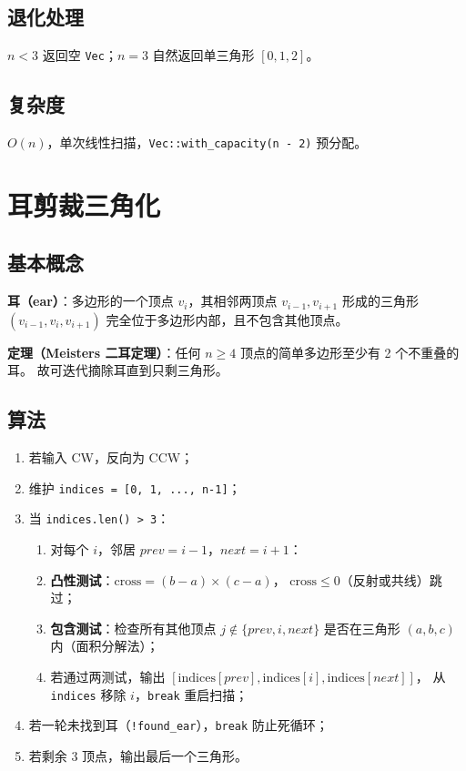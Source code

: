 \documentclass[11pt,a4paper]{article}
\begin{document}
\subsection{退化处理}

$n < 3$ 返回空 \texttt{Vec}；$n = 3$ 自然返回单三角形 $[0, 1, 2]$。

\subsection{复杂度}

$O(n)$，单次线性扫描，\texttt{Vec::with\_capacity(n - 2)} 预分配。

\section{耳剪裁三角化}

\subsection{基本概念}

\textbf{耳（ear）}：多边形的一个顶点 $v_i$，其相邻两顶点 $v_{i-1}, v_{i+1}$
形成的三角形 $(v_{i-1}, v_i, v_{i+1})$ 完全位于多边形内部，且不包含其他顶点。

\textbf{定理（Meisters 二耳定理）}：任何 $n \ge 4$ 顶点的简单多边形至少有 2 个不重叠的耳。
故可迭代摘除耳直到只剩三角形。

\subsection{算法}

\begin{enumerate}
  \item 若输入 CW，反向为 CCW；
  \item 维护 \texttt{indices = [0, 1, ..., n-1]}；
  \item 当 \texttt{indices.len() > 3}：
    \begin{enumerate}
      \item 对每个 $i$，邻居 $prev = i-1$，$next = i+1$：
      \item \textbf{凸性测试}：$\text{cross} = (b - a) \times (c - a)$，
            $\text{cross} \le 0$（反射或共线）跳过；
      \item \textbf{包含测试}：检查所有其他顶点 $j \notin \{prev, i, next\}$
            是否在三角形 $(a, b, c)$ 内（面积分解法）；
      \item 若通过两测试，输出 $[\text{indices}[prev], \text{indices}[i], \text{indices}[next]]$，
            从 \texttt{indices} 移除 $i$，\texttt{break} 重启扫描；
    \end{enumerate}
  \item 若一轮未找到耳（\texttt{!found\_ear}），\texttt{break} 防止死循环；
  \item 若剩余 3 顶点，输出最后一个三角形。
\end{enumerate}
\end{document}
